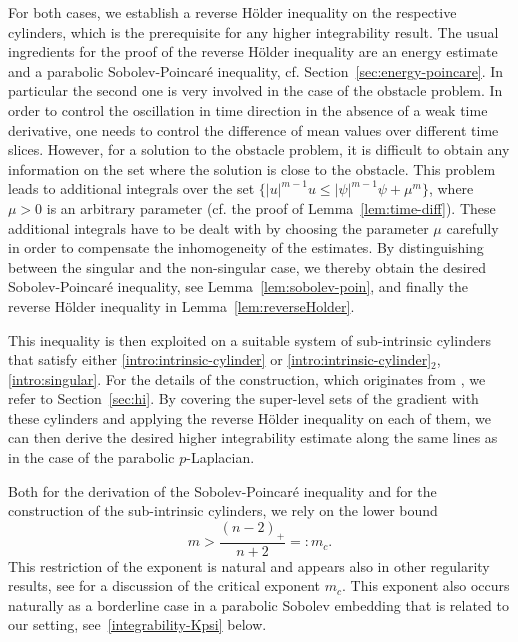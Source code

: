 \documentclass[a4paper, 10pt, american]{amsart}
\numberwithin{theorem}{section}
\numberwithin{equation}{section}
\begin{document}
For both cases, we establish a reverse H\"older inequality on the
respective cylinders, which is the prerequisite for any higher
integrability result. The usual ingredients for the proof of the
reverse H\"older inequality are an energy estimate and a parabolic
Sobolev-Poincar\'e inequality, cf. Section~\ref{sec:energy-poincare}.
In particular the second one is very involved in the case of the
obstacle problem. In order to control the oscillation in time
direction in the absence of a weak time derivative, one needs to
control the difference of mean values over different time
slices. However, for a solution to the obstacle problem, it is difficult to
obtain any information on the set where the solution is close to the
obstacle. This problem leads to additional integrals over the set
$\{|u|^{m-1}u\le|\psi|^{m-1}\psi+\mu^m\}$, where $\mu>0$ is an
arbitrary parameter (cf. the proof of
Lemma~\ref{lem:time-diff}). These additional integrals have to be
dealt with by choosing the parameter $\mu$ carefully in order to
compensate the inhomogeneity of the estimates. By distinguishing
between the singular and the non-singular case, we thereby obtain the
desired Sobolev-Poincar\'e inequality, see
Lemma~\ref{lem:sobolev-poin}, and finally the reverse H\"older
inequality in Lemma~\ref{lem:reverseHolder}.

This inequality is then exploited on a suitable system of
sub-intrinsic cylinders that satisfy either
\eqref{intro:intrinsic-cylinder} or
\eqref{intro:intrinsic-cylinder}$_2$, \eqref{intro:singular}.
For the details of the construction, which originates from
\cite{Gianazza-Schwarzacher,BDS-singular-higher-int}, we refer to
Section~\ref{sec:hi}. By covering the super-level sets of the gradient
with these cylinders and applying the reverse H\"older inequality on
each of them, we can then derive the desired higher integrability
estimate along the same lines as in the case of the
parabolic $p$-Laplacian.  

Both for the derivation of the Sobolev-Poincar\'e inequality and for
the construction of the sub-intrinsic cylinders, we rely on the lower bound
\begin{equation*}
  m>\frac{(n-2)_+}{n+2}=:m_c.
\end{equation*}
This restriction of the exponent is natural and appears also in other
regularity results, see \cite[Section 6.21.6]{DBGV-book} for a
discussion of the critical exponent $m_c$. This exponent also occurs
naturally
as a borderline case in a parabolic Sobolev embedding that is related to
our setting, see~\eqref{integrability-Kpsi} below.
\end{document}

